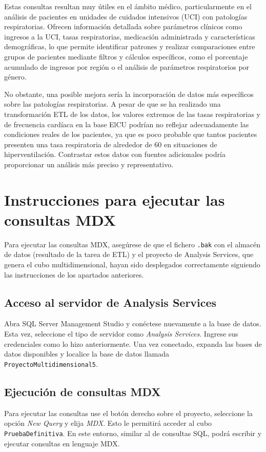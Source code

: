 \documentclass[12pt, a4paper, twoside]{article}
\begin{document}
	
Estas consultas resultan muy útiles en el ámbito médico, particularmente en el análisis de pacientes en unidades de cuidados intensivos (UCI) con patologías respiratorias. Ofrecen información detallada sobre parámetros clínicos como ingresos a la UCI, tasas respiratorias, medicación administrada y características demográficas, lo que permite identificar patrones y realizar comparaciones entre grupos de pacientes mediante filtros y cálculos específicos, como el porcentaje acumulado de ingresos por región o el análisis de parámetros respiratorios por género.

No obstante, una posible mejora sería la incorporación de datos más específicos sobre las patologías respiratorias. A pesar de que se ha realizado una transformación ETL de los datos, los valores extremos de las tasas respiratorias y de frecuencia cardíaca en la base ElCU podrían no reflejar adecuadamente las condiciones reales de los pacientes, ya que es poco probable que tantos pacientes presenten una tasa respiratoria de alrededor de 60 en situaciones de hiperventilación. Contrastar estos datos con fuentes adicionales podría proporcionar un análisis más preciso y representativo.
	
	
	\section{Instrucciones para ejecutar las consultas MDX}
	
	Para ejecutar las consultas MDX, asegúrese de que el fichero \texttt{.bak} con el almacén de datos (resultado de la tarea de ETL) y el proyecto de Analysis Services, que genera el cubo multidimensional, hayan sido desplegados correctamente siguiendo las instrucciones de los apartados anteriores.
	
	\subsection{Acceso al servidor de Analysis Services}
	Abra SQL Server Management Studio y conéctese nuevamente a la base de datos. Esta vez, seleccione el tipo de servidor como \textit{Analysis Services}. Ingrese sus credenciales como lo hizo anteriormente. Una vez conectado, expanda las bases de datos disponibles y localice la base de datos llamada \texttt{ProyectoMultidimensional5}.
	
	\subsection{Ejecución de consultas MDX}
	Para ejecutar las consultas use el botón derecho sobre el proyecto, seleccione la opción \textit{New Query} y elija \textit{MDX}. Esto le permitirá acceder al cubo \texttt{PruebaDefinitiva}. En este entorno, similar al de consultas SQL, podrá escribir y ejecutar consultas en lenguaje MDX.
	
\end{document}

